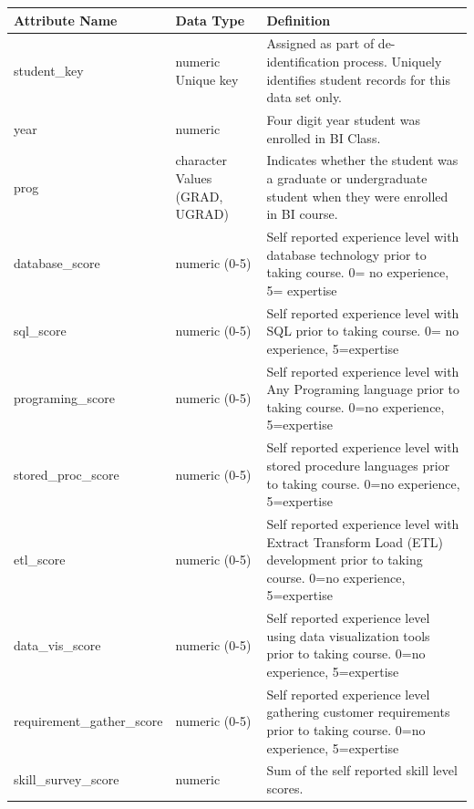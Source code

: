 \documentclass[
]{article}
\begin{document}
\begin{longtable}[]{@{}
  >{\raggedright\arraybackslash}p{}
  >{\raggedright\arraybackslash}p{}
  >{\raggedright\arraybackslash}p{}@{}}
\toprule\noalign{}
\begin{minipage}[b]{\linewidth}\raggedright
Attribute Name
\end{minipage} & \begin{minipage}[b]{\linewidth}\raggedright
Data Type
\end{minipage} & \begin{minipage}[b]{\linewidth}\raggedright
Definition
\end{minipage} \\
\midrule\noalign{}
\endhead
\bottomrule\noalign{}
\endlastfoot
student\_key & numeric Unique key & Assigned as part of
de-identification process. Uniquely identifies student records for this
data set only. \\
year & numeric & Four digit year student was enrolled in BI Class. \\
prog & character Values (GRAD, UGRAD) & Indicates whether the student
was a graduate or undergraduate student when they were enrolled in BI
course. \\
database\_score & numeric (0-5) & Self reported experience level with
database technology prior to taking course. 0= no experience, 5=
expertise \\
sql\_score & numeric (0-5) & Self reported experience level with SQL
prior to taking course. 0= no experience, 5=expertise \\
programing\_score & numeric (0-5) & Self reported experience level with
Any Programing language prior to taking course. 0=no experience,
5=expertise \\
stored\_proc\_score & numeric (0-5) & Self reported experience level
with stored procedure languages prior to taking course. 0=no experience,
5=expertise \\
etl\_score & numeric (0-5) & Self reported experience level with Extract
Transform Load (ETL) development prior to taking course. 0=no
experience, 5=expertise \\
data\_vis\_score & numeric (0-5) & Self reported experience level using
data visualization tools prior to taking course. 0=no experience,
5=expertise \\
requirement\_gather\_score & numeric (0-5) & Self reported experience
level gathering customer requirements prior to taking course. 0=no
experience, 5=expertise \\
skill\_survey\_score & numeric & Sum of the self reported skill level
scores. \\
\end{longtable}
\end{document}
